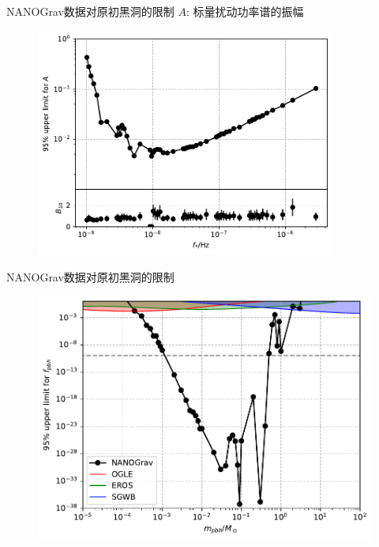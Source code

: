 \documentclass[xcolor=dvipsnames]{beamer} %
\begin{document}
\begin{frame}{NANOGrav数据对原初黑洞的限制}
    \vspace{-1.5mm} 
    \centering
    $A$: 标量扰动功率谱的振幅
    \vspace{-1.0mm} 
    \begin{figure}[htbp!]
        \centering
        \includegraphics[width = 0.88\textwidth]{./pic/A_upper.pdf}
    \end{figure}
\end{frame}

\begin{frame}{NANOGrav数据对原初黑洞的限制}
    \vspace{-2.5mm} 
    \begin{figure}[htbp!]
        \centering
        \includegraphics[width = \textwidth]{./pic/fpbh_upper.pdf}
    \end{figure}
\end{frame}
\end{document}
